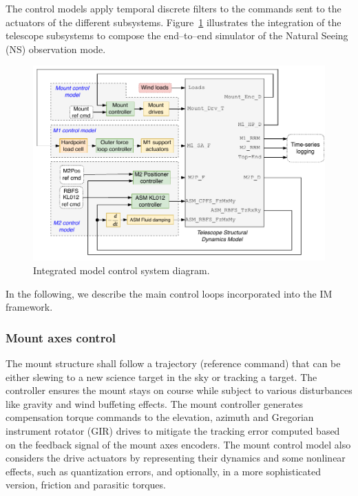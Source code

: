 %
%


The control models apply temporal discrete filters to the commands sent to the actuators of the different subsystems. Figure~\ref{fig:im_control_sys} illustrates the integration of the telescope subsystems to compose the end--to--end simulator of the Natural Seeing (NS) observation mode. %
\begin{figure}[!hb]
  \centering
  \includegraphics[width=\textwidth]{./ctrl_sec_images/pttASM_end2end_syslevel.pdf}
  \caption{Integrated model control system diagram.}
    \label{fig:im_control_sys}
  \end{figure}
In the following, we describe the main control loops incorporated into the IM framework.


\subsubsection{Mount axes control}
\label{sec:mount-ctrlr}

The mount structure shall follow a trajectory (reference command) that can be either slewing to a new science target in the sky or tracking a target. The controller ensures the mount stays on course while subject to various disturbances like gravity and wind buffeting effects. The mount controller generates compensation torque commands to the elevation, azimuth and Gregorian instrument rotator (GIR) drives to mitigate the tracking error computed based on the feedback signal of the mount axes encoders. The mount control model also considers the drive actuators by representing their dynamics and some nonlinear effects, such as quantization errors, and optionally, in a more sophisticated version, friction and parasitic torques.

